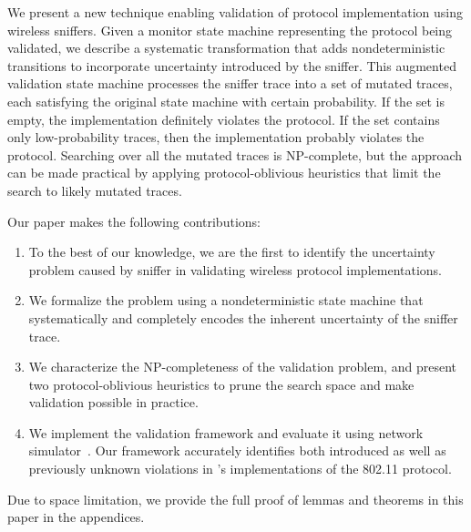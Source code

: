 We present a new technique enabling  validation of protocol
implementation using wireless sniffers.
Given a monitor state machine representing the protocol being validated, we describe a
systematic transformation that adds nondeterministic transitions to
incorporate uncertainty introduced by the sniffer.
This augmented validation state machine processes the sniffer trace into a set
of mutated traces, each satisfying the original state machine with certain
probability.
If the set is empty, the implementation definitely violates the protocol.
If the set contains only low-probability traces, then the implementation
probably violates the protocol.
Searching over all the mutated traces is NP-complete, but the approach can be made
practical by applying protocol-oblivious heuristics that limit the search to
likely mutated traces.

Our paper makes the following contributions:
\begin{enumerate}
		  \item To the best of our knowledge, we are the first to identify the
    uncertainty problem caused by sniffer in validating wireless protocol
    implementations.
		  \item We formalize the problem using a nondeterministic state machine that
    systematically and completely encodes the inherent uncertainty of the
    sniffer trace.
		    \item We characterize the NP-completeness of the validation problem, and
      present two protocol-oblivious heuristics to prune the search
      space and make validation possible in practice.
			\item We implement the validation framework and evaluate it using
    \ns{} network simulator~\cite{riley2010ns}.
		    Our framework accurately identifies both introduced as well as previously
    unknown violations in \ns{}'s implementations of the 802.11 protocol.
\end{enumerate}

Due to space limitation, we provide the full proof of lemmas and theorems in this
paper in the appendices.

\begin{comment}
The rest of this paper is organized as follows.
We motivate the uncertainty problem in Section~\ref{sec:model}.
We then formally describe the problem in Section~\ref{sec:framework},
including the completeness of the augmentation (\S~\ref{subsec:augment}),
hardness analysis (\S~\ref{subsec:hard}) and search algorithms
(\S~\ref{subsec:search}).
We continue by evaluating our framework through two case studies in
Section~\ref{sec:case}.  Finally, we present related works in
Section~\ref{sec:related} and concludes in Section~\ref{sec:conclusion}.
\end{comment}
